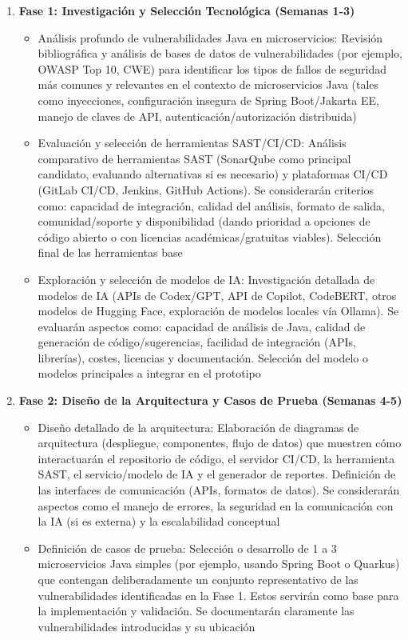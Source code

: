 \begin{enumerate}
    \item \textbf{Fase 1: Investigación y Selección Tecnológica (Semanas 1-3)}
    \begin{itemize}
        \item Análisis profundo de vulnerabilidades Java en microservicios: Revisión bibliográfica y análisis de bases de datos de vulnerabilidades (por ejemplo, OWASP Top 10, CWE) para identificar los tipos de fallos de seguridad más comunes y relevantes en el contexto de microservicios Java (tales como inyecciones, configuración insegura de Spring Boot/Jakarta EE, manejo de claves de API, autenticación/autorización distribuida)
        \item Evaluación y selección de herramientas SAST/CI/CD: Análisis comparativo de herramientas SAST (SonarQube como principal candidato, evaluando alternativas si es necesario) y plataformas CI/CD (GitLab CI/CD, Jenkins, GitHub Actions). Se considerarán criterios como: capacidad de integración, calidad del análisis, formato de salida, comunidad/soporte y disponibilidad (dando prioridad a opciones de código abierto o con licencias académicas/gratuitas viables). Selección final de las herramientas base
        \item Exploración y selección de modelos de IA: Investigación detallada de modelos de IA (APIs de Codex/GPT, API de Copilot, CodeBERT, otros modelos de Hugging Face, exploración de modelos locales vía Ollama). Se evaluarán aspectos como: capacidad de análisis de Java, calidad de generación de código/sugerencias, facilidad de integración (APIs, librerías), costes, licencias y documentación. Selección del modelo o modelos principales a integrar en el prototipo
    \end{itemize}
    
    \item \textbf{Fase 2: Diseño de la Arquitectura y Casos de Prueba (Semanas 4-5)}
    \begin{itemize}
        \item Diseño detallado de la arquitectura: Elaboración de diagramas de arquitectura (despliegue, componentes, flujo de datos) que muestren cómo interactuarán el repositorio de código, el servidor CI/CD, la herramienta SAST, el servicio/modelo de IA y el generador de reportes. Definición de las interfaces de comunicación (APIs, formatos de datos). Se considerarán aspectos como el manejo de errores, la seguridad en la comunicación con la IA (si es externa) y la escalabilidad conceptual
        \item Definición de casos de prueba: Selección o desarrollo de 1 a 3 microservicios Java simples (por ejemplo, usando Spring Boot o Quarkus) que contengan deliberadamente un conjunto representativo de las vulnerabilidades identificadas en la Fase 1. Estos servirán como base para la implementación y validación. Se documentarán claramente las vulnerabilidades introducidas y su ubicación
    \end{itemize}
    

\end{enumerate}
